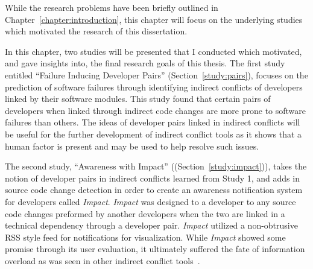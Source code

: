 \label{chapter:motivating}

\newlength{\savedunitlength}
\setlength{\unitlength}{2em}

While the research problems have been briefly outlined in Chapter~\ref{chapter:introduction}, this chapter
will focus on the underlying studies which motivated the research of this dissertation.

In this chapter, two studies will be presented that I conducted which motivated, and gave insights into, 
the final research goals
of this thesis. The first study entitled ``Failure Inducing Developer Pairs''
(Section~\ref{study:pairs}), focuses on the prediction of
software failures through identifying indirect conflicts of developers linked by their software modules. 
This study found that certain pairs of developers when linked through indirect code changes are more prone
to software failures than others. The ideas of developer pairs linked in indirect conflicts will be
useful for the further development of indirect conflict tools as it shows that a human factor is present
and may be used to help resolve such issues.

The second study, ``Awareness with Impact'' ((Section~\ref{study:impact})), 
takes the notion of developer
pairs in indirect conflicts learned from Study 1, and adds in source code change detection in order to create
an awareness notification system for developers called \textit{Impact}. \textit{Impact} was designed to a developer
to any source code changes preformed by another developers when the two are linked in a technical dependency through
a developer pair. \textit{Impact} utilized a non-obtrusive RSS style feed for notifications for visualization. 
While \textit{Impact} showed some promise through its user evaluation, it ultimately suffered the fate of information
overload as was seen in other indirect conflict tools~\cite{Sarma:2007:TSA,Servant:2010:CPI,Trainer:2005:BGT}.




\setlength{\unitlength}{\savedunitlength}
